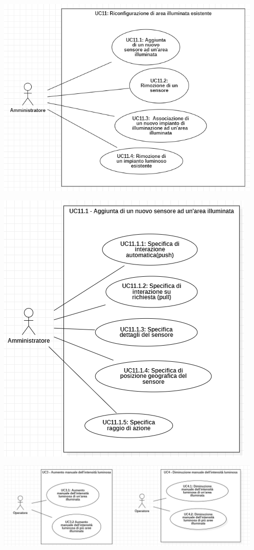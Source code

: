 \documentclass[a4paper, 12pt]{article}
\begin{document}
\includegraphics[scale=0.7]{diagramma_use_case_4.png}

\includegraphics[scale=0.7]{diagramma_use_case_5.png}

\includegraphics[scale=0.60]{diagramma_use_case_6e7.png}
\end{document}
